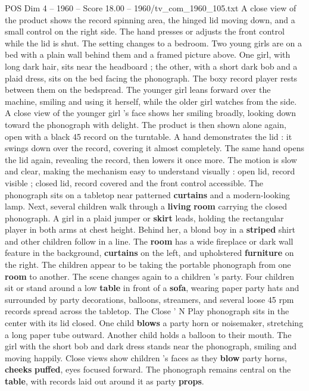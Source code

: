 \begin{textsample}{POS Dim 4 – 1960 – Score 18.00 – 1960/tv\_com\_1960\_105.txt}
A close view of the product shows the record spinning area, the hinged lid moving down, and a small control on the right side.
The hand presses or adjusts the front control while the lid is shut.
The setting changes to a bedroom.
Two young girls are on a bed with a plain wall behind them and a framed picture above.
One girl, with long dark hair, sits near the headboard ; the other, with a short dark bob and a plaid dress, sits on the bed facing the phonograph.
The boxy record player rests between them on the bedspread.
The younger girl leans forward over the machine, smiling and using it herself, while the older girl watches from the side.
A close view of the younger girl ’s face shows her smiling broadly, looking down toward the phonograph with delight.
The product is then shown alone again, open with a black 45 record on the turntable.
A hand demonstrates the lid : it swings down over the record, covering it almost completely.
The same hand opens the lid again, revealing the record, then lowers it once more.
The motion is slow and clear, making the mechanism easy to understand visually : open lid, record visible ; closed lid, record covered and the front control accessible.
The phonograph sits on a tabletop near patterned \textbf{curtains} and a modern-looking lamp.
Next, several children walk through a \textbf{living} \textbf{room} carrying the closed phonograph.
A girl in a plaid jumper or \textbf{skirt} leads, holding the rectangular player in both arms at chest height.
Behind her, a blond boy in a \textbf{striped} shirt and other children follow in a line.
The \textbf{room} has a wide fireplace or dark wall feature in the background, \textbf{curtains} on the left, and upholstered \textbf{furniture} on the right.
The children appear to be taking the portable phonograph from one \textbf{room} to another.
The scene changes again to a children ’s party.
Four children sit or stand around a low \textbf{table} in front of a \textbf{sofa}, wearing paper party hats and surrounded by party decorations, balloons, streamers, and several loose 45 rpm records spread across the tabletop.
The Close ’ N Play phonograph sits in the center with its lid closed.
One child \textbf{blows} a party horn or noisemaker, stretching a long paper tube outward.
Another child holds a balloon to their mouth.
The girl with the short bob and dark dress stands near the phonograph, smiling and moving happily.
Close views show children ’s faces as they \textbf{blow} party horns, \textbf{cheeks} \textbf{puffed}, eyes focused forward.
The phonograph remains central on the \textbf{table}, with records laid out around it as party \textbf{props}.

\end{textsample}
